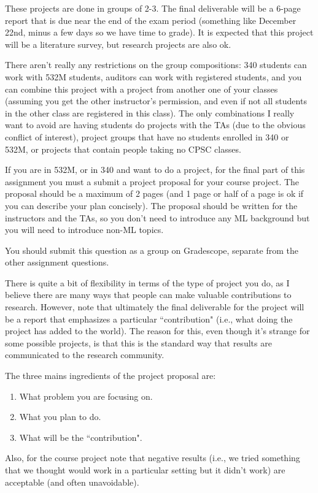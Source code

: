 \documentclass{article}
\def\blu#1{{\color{blu}#1}}
\begin{document}
These projects are done in \blu{groups of 2-3}. The final deliverable will be a \blu{6-page report that is due near the end of the exam period} (something like December 22nd, minus a few days so we have time to grade). It is expected that this project will be a literature survey, but research projects are also ok.

There aren't really any restrictions on the group compositions: 340 students can work with 532M students, auditors can work with registered students, and you can combine this project with a project from another one of your classes (assuming you get the other instructor's permission, and even if not all students in the other class are registered in this class). The only combinations I really want to avoid are having students do projects with the TAs (due to the obvious conflict of interest), project groups that have no students enrolled in 340 or 532M, or projects that contain people taking no CPSC classes.

If you are in 532M, or in 340 and want to do a project, for the final part of this assignment you must a \blu{submit a project proposal} for your course project. The proposal should be a maximum of 2 pages (and 1 page or half of a page is ok if you can describe your plan concisely). The proposal should be written for the instructors and the TAs, so you don't need to introduce any ML background but you will need to introduce non-ML topics.

\blu{You should submit this question as a group on Gradescope, separate from the other assignment questions.}

There is quite a bit of flexibility in terms of the type of project you do, as I believe there are many ways that people can make valuable contributions to research. However, note that ultimately the final deliverable for the project will be a report that emphasizes a particular ``contribution" (i.e., what doing the project has added to the world).
The reason for this, even though it's strange for some possible projects, is that this is the standard way that results are communicated to the research community.

\blu{The three mains ingredients of the project proposal are:
\begin{enumerate}
\item What problem you are focusing on.
\item What you plan to do.
\item What will be the ``contribution".
\end{enumerate}
}
Also, for the course project note that negative results (i.e., we tried something that we thought would work in a particular setting but it didn't work) are acceptable (and often unavoidable).
\end{document}
